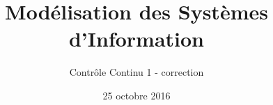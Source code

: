 \title{
   Modélisation des Systèmes d'Information
}
\author{
	Contrôle Continu 1 - correction
}
\date{25 octobre 2016}
